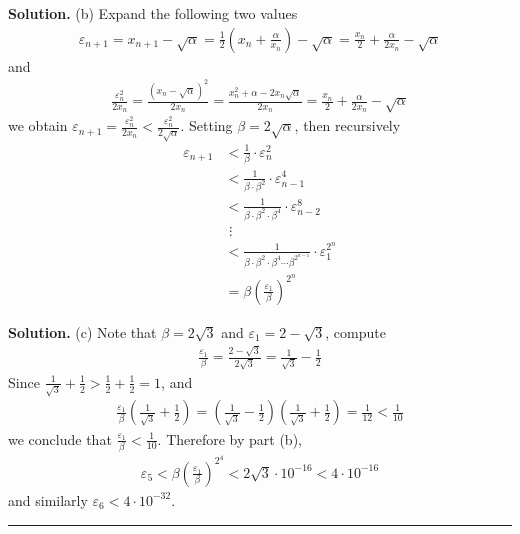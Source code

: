\documentclass[12pt]{article}
\theoremstyle{definition}
\begin{document}
\smallskip
\noindent\textbf{Solution.}\quad
(b) Expand the following two values
\begin{align*}
\varepsilon_{n+1}
=x_{n+1}-\sqrt{\alpha}
=\frac{1}{2}\left(x_n+\frac{\alpha}{x_n}\right)-\sqrt{\alpha}
=\frac{x_n}{2}+\frac{\alpha}{2x_n}-\sqrt{\alpha}
\end{align*}
and
\begin{align*}
\frac{\varepsilon_n^2}{2x_n}
=\frac{\left(x_n-\sqrt{\alpha}\right)^2}{2x_n}
=\frac{x_n^2+\alpha-2x_n\sqrt{\alpha}}{2x_n}
=\frac{x_n}{2}+\frac{\alpha}{2x_n}-\sqrt{\alpha}
\end{align*}
we obtain $\varepsilon_{n+1}=\frac{\varepsilon_n^2}{2x_n}<\frac{\varepsilon_n^2}{2\sqrt{\alpha}}$. Setting $\beta=2\sqrt{\alpha}$, then recursively
\begin{align*}
\varepsilon_{n+1}
&<\frac{1}{\beta}\cdot\varepsilon_n^2 \\
&<\frac{1}{\beta\cdot\beta^2}\cdot\varepsilon_{n-1}^4 \\
&<\frac{1}{\beta\cdot\beta^2\cdot\beta^4}\cdot\varepsilon_{n-2}^8 \\
&\,\,\vdots \\
&<\frac{1}{\beta\cdot\beta^2\cdot\beta^4\cdots\beta^{2^{n-1}}}\cdot\varepsilon_{1}^{2^n} \\
&=\beta\left(\frac{\varepsilon_1}{\beta}\right)^{2^n}
\end{align*}

\smallskip
\noindent\textbf{Solution.}\quad
(c) Note that $\beta=2\sqrt{3}$ and $\varepsilon_1=2-\sqrt{3}$, compute
\begin{align*}
\frac{\varepsilon_1}{\beta}
=\frac{2-\sqrt{3}}{2\sqrt{3}}
=\frac{1}{\sqrt{3}}-\frac{1}{2}
\end{align*}
Since $\frac{1}{\sqrt{3}}+\frac{1}{2}>\frac{1}{2}+\frac{1}{2}=1$, and
\begin{align*}
\frac{\varepsilon_1}{\beta}\left(\frac{1}{\sqrt{3}}+\frac{1}{2}\right)
=\left(\frac{1}{\sqrt{3}}-\frac{1}{2}\right)\left(\frac{1}{\sqrt{3}}+\frac{1}{2}\right)
=\frac{1}{12}
<\frac{1}{10}
\end{align*}
we conclude that $\frac{\varepsilon_1}{\beta}<\frac{1}{10}$. Therefore by part (b),
\begin{align*}
\varepsilon_5
<\beta\left(\frac{\varepsilon_1}{\beta}\right)^{2^4}
<2\sqrt{3}\cdot 10^{-16}
<4\cdot 10^{-16}
\end{align*}
and similarly $\varepsilon_6<4\cdot 10^{-32}$.



\bigskip\noindent\hrule\bigskip
\end{document}

